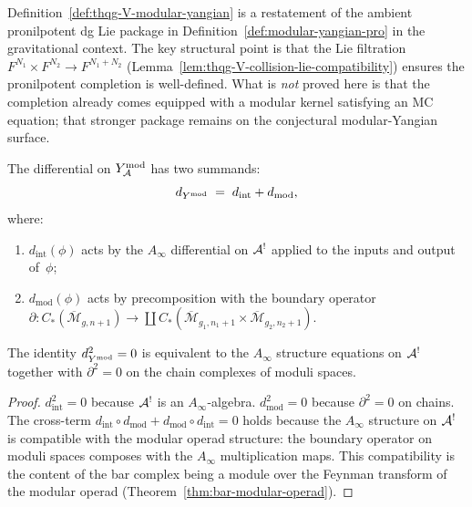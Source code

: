 \begin{remark}
\label{rem:thqg-V-yangian-comparison}
Definition~\ref{def:thqg-V-modular-yangian} is a restatement
of the ambient pronilpotent dg Lie package in
Definition~\ref{def:modular-yangian-pro} in the gravitational
context. The key structural point is that the Lie filtration
$F^{N_1} \times F^{N_2} \to F^{N_1 + N_2}$
(Lemma~\ref{lem:thqg-V-collision-lie-compatibility}) ensures the
pronilpotent completion is well-defined. What is \emph{not} proved
here is that the completion already comes equipped with a modular
kernel satisfying an MC equation; that stronger package remains on the
conjectural modular-Yangian surface.
\end{remark}

\begin{proposition}
\label{prop:thqg-V-yangian-differential}
The differential on $Y^{\mathrm{mod}}_{\mathcal{A}}$ has two summands:
\begin{equation}\label{eq:thqg-V-yangian-diff}
d_{Y^{\mathrm{mod}}}
\;=\;
d_{\mathrm{int}} + d_{\mathrm{mod}},
\end{equation}
where:
\begin{enumerate}[label=\textup{(\roman*)}]
\item $d_{\mathrm{int}}(\phi)$ acts by the $A_\infty$ differential
 on $\mathcal{A}^!$ applied to the inputs and output of~$\phi$;
\item $d_{\mathrm{mod}}(\phi)$ acts by precomposition with the
 boundary operator
 $\partial\colon C_*(\overline{\mathcal{M}}_{g,n+1})
 \to \coprod C_*(\overline{\mathcal{M}}_{g_1,n_1+1}
 \times \overline{\mathcal{M}}_{g_2,n_2+1})$.
\end{enumerate}
The identity $d_{Y^{\mathrm{mod}}}^2 = 0$ is equivalent to the $A_\infty$
structure equations on $\mathcal{A}^!$ together with $\partial^2 = 0$ on the
chain complexes of moduli spaces.
\end{proposition}

\begin{proof}
$d_{\mathrm{int}}^2 = 0$ because $\mathcal{A}^!$ is an $A_\infty$-algebra.
$d_{\mathrm{mod}}^2 = 0$ because $\partial^2 = 0$ on chains.
The cross-term
$d_{\mathrm{int}} \circ d_{\mathrm{mod}} +
d_{\mathrm{mod}} \circ d_{\mathrm{int}} = 0$
holds because the $A_\infty$ structure on $\mathcal{A}^!$ is compatible
with the modular operad structure: the boundary operator on moduli
spaces composes with the $A_\infty$ multiplication maps. This
compatibility is the content of the bar complex being a
module over the Feynman transform of the modular operad
(Theorem~\ref{thm:bar-modular-operad}).
\end{proof}


